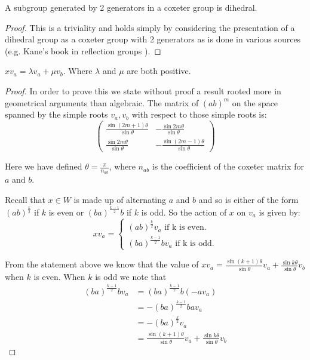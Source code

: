 \documentclass[a4paper,12pt]{article}
\begin{document}
\begin{lem}
	A subgroup generated by 2 generators in a coxeter group is dihedral.
\end{lem}

\begin{proof}
	This is a triviality and holds simply by considering the presentation of a dihedral group as a coxeter group with 2 generators as is done in various sources (e.g. Kane's book in reflection groups \cite{kane01}).
\end{proof}

\begin{lem}
	$xv_a = \lambda v_a + \mu v_b$. Where $\lambda$ and $\mu$ are both positive.
\end{lem}

\begin{proof}
	In order to prove this we state without proof a result rooted more in geometrical arguments than algebraic. The matrix of $(ab)^m$ on the space spanned by the simple roots $v_a, v_b$ with respect to those simple roots is:
\[ \left( \begin{array}{cc}
\frac{\sin{(2m+1)\theta}}{\sin{\theta}} & -\frac{\sin{2m\theta}}{\sin{\theta}} \\ 
\frac{\sin{2m\theta}}{\sin{\theta}} & -\frac{\sin{(2m-1)\theta}}{\sin{\theta}}
\end{array} \right) \]

	Here we have defined $\theta = \frac{\pi}{n_{ab}}$, where $n_{ab}$ is the coefficient of the coxeter matrix for $a$ and $b$.

	Recall that $x \in W$ is made up of alternating $a$ and $b$ and so is either of the form $(ab)^{\frac{k}{2}}$ if $k$ is even or $(ba)^{\frac{k-1}{2}}b$ if $k$ is odd. So the action of $x$ on $v_a$ is given by:
	\begin{equation*}
		xv_a = 
		\begin{cases}
			(ab)^{\frac{k}{2}}v_a \text{ if k is even.} \\
			(ba)^{\frac{k-1}{2}}bv_a \text{ if k is odd.}
		\end{cases}
	\end{equation*}
	
	From the statement above we know that the value of $xv_a = \frac{\sin{(k+1)\theta}}{\sin{\theta}}v_a + \frac{\sin{k\theta}}{\sin{\theta}}v_b$ when $k$ is even. When $k$ is odd we note that 
	\begin{align*}
		(ba)^{\frac{k-1}{2}}bv_a &= (ba)^{\frac{k-1}{2}}b(-av_a) \\
		&= -(ba)^{\frac{k-1}{2}}bav_a \\
		&= -(ba)^{\frac{k}{2}}v_a \\
		&= \frac{\sin{(k+1)\theta}}{\sin{\theta}}v_a + \frac{\sin{k\theta}}{\sin{\theta}}v_b
	\end{align*}


\end{proof}
\end{document}
